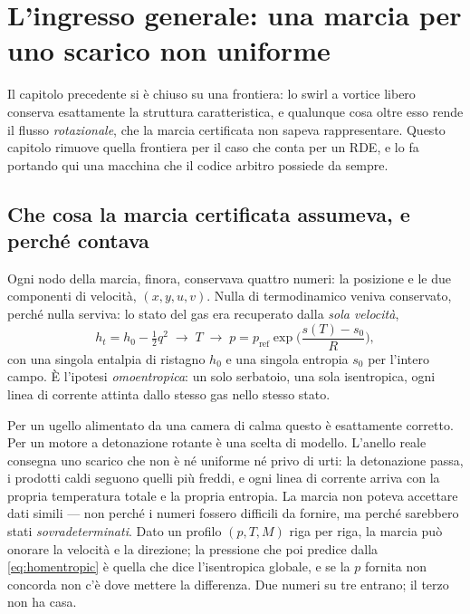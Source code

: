 \chapter{L'ingresso generale: una marcia per uno scarico non
uniforme}
\label{ch:generalinlet}

Il capitolo precedente si è chiuso su una frontiera: lo swirl a
vortice libero conserva esattamente la struttura caratteristica, e
qualunque cosa oltre esso rende il flusso \emph{rotazionale}, che la
marcia certificata non sapeva rappresentare. Questo capitolo rimuove
quella frontiera per il caso che conta per un RDE, e lo fa portando
qui una macchina che il codice arbitro possiede da sempre.

\section{Che cosa la marcia certificata assumeva, e perché contava}

Ogni nodo della marcia, finora, conservava quattro numeri: la
posizione e le due componenti di velocità, $(x, y, u, v)$. Nulla di
termodinamico veniva conservato, perché nulla serviva: lo stato del
gas era recuperato dalla \emph{sola velocità},
\begin{equation}
  h_t = h_0 - \tfrac12 q^2 \;\longrightarrow\; T
  \;\longrightarrow\;
  p = p_{\mathrm{ref}}\exp\!\Big(\frac{s(T) - s_0}{R}\Big),
  \label{eq:homentropic}
\end{equation}
con una singola entalpia di ristagno $h_0$ e una singola entropia
$s_0$ per l'intero campo. È l'ipotesi \emph{omoentropica}: un solo
serbatoio, una sola isentropica, ogni linea di corrente attinta dallo
stesso gas nello stesso stato.

Per un ugello alimentato da una camera di calma questo è esattamente
corretto. Per un motore a detonazione rotante è una scelta di
modello. L'anello reale consegna uno scarico che non è né uniforme né
privo di urti: la detonazione passa, i prodotti caldi seguono quelli
più freddi, e ogni linea di corrente arriva con la propria
temperatura totale e la propria entropia. La marcia non poteva
accettare dati simili --- non perché i numeri fossero difficili da
fornire, ma perché sarebbero stati \emph{sovradeterminati}. Dato un
profilo $(p, T, M)$ riga per riga, la marcia può onorare la velocità
e la direzione; la pressione che poi predice dalla
\eqref{eq:homentropic} è quella che dice l'isentropica globale, e se
la $p$ fornita non concorda non c'è dove mettere la differenza. Due
numeri su tre entrano; il terzo non ha casa.

